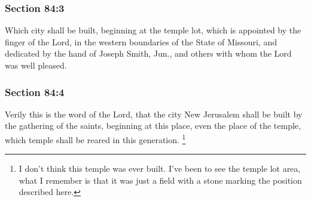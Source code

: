
	\subsubsection{Section 84:3} %
		\label{DC84-3}

		Which city shall be built, beginning at the temple lot, which is appointed by the finger of the Lord, in the western boundaries of the State of Missouri, and dedicated by the hand of Joseph Smith, Jun., and others with whom the Lord was well pleased.


	\subsubsection{Section 84:4} %
		\label{DC84-4}

		Verily this is the word of the Lord, that the city New Jerusalem shall be built by the gathering of the saints, beginning at this place, even the place of the temple, which temple shall be reared in this generation.%
			\footnote{%
				I don't think this temple was ever built. I've been to see the temple lot area, what I remember is that it was just a field with a stone marking the position described here.
				}


